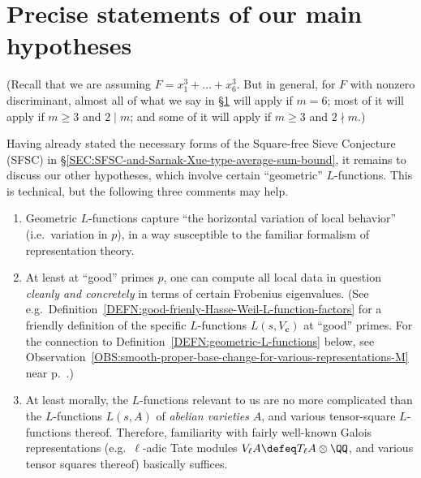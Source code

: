 \documentclass[12pt]{report}
\begin{document}

\section{Precise statements of our main hypotheses}
\label{SEC:precise-standard-conjectural-hypotheses}

(Recall that we are assuming $F=x_1^3+\dots+x_6^3$.
But in general, for $F$ with nonzero discriminant, almost all of what we say in \S\ref{SEC:precise-standard-conjectural-hypotheses} will apply if $m=6$; most of it will apply if $m\geq 3$ and $2\mid m$; and some of it will apply if $m\geq 3$ and $2\nmid m$.)

Having already stated the necessary forms of the Square-free Sieve Conjecture (SFSC) in \S\ref{SEC:SFSC-and-Sarnak-Xue-type-average-sum-bound},
it remains to discuss our other hypotheses, which involve certain ``geometric'' $L$-functions.
This is technical,
but the following three comments may help.
\begin{enumerate}[(1)]
    \item Geometric $L$-functions capture
    ``the horizontal variation of local behavior''
    (i.e.~variation in $p$),
    in a way susceptible to
    the familiar formalism of representation theory.
    
    \item At least at ``good'' primes $p$,
    one can compute all local data in question
    \emph{cleanly and concretely}
    in terms of certain Frobenius eigenvalues.
    (See e.g.~Definition~\ref{DEFN:good-frienly-Hasse-Weil-L-function-factors}
    for a friendly definition of
    the specific $L$-functions $L(s,V_{\bm{c}})$
    at ``good'' primes.
    For the connection to Definition~\ref{DEFN:geometric-L-functions} below,
    see Observation~\ref{OBS:smooth-proper-base-change-for-various-representations-M} near p.~\pageref{OBS:smooth-proper-base-change-for-various-representations-M}.)
    
    \item At least morally,
    the $L$-functions relevant to us
    are no more complicated than
    the $L$-functions $L(s,A)$ of \emph{abelian varieties} $A$,
    and various tensor-square $L$-functions thereof.
    Therefore,
    familiarity with fairly well-known Galois representations
    (e.g.~$\ell$-adic Tate modules $V_\ell A\defeq T_\ell A\otimes\QQ$,
    and various tensor squares thereof)
    basically suffices.
\end{enumerate}
\end{document}
